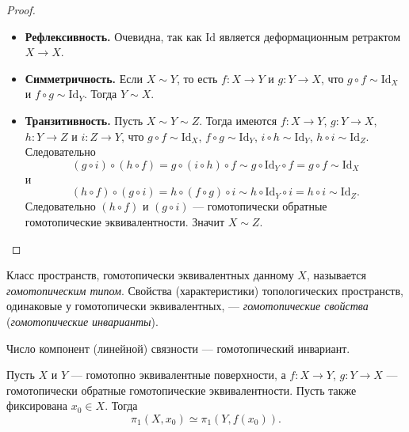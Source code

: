 \documentclass[12pt,a4paper]{article}
\newcommand{\Id}{\ensuremath{\mathrm{Id}}\xspace}
\begin{document}
    \begin{proof}
        \begin{itemize}
            \item \textbf{Рефлексивность.} Очевидна, так как $\Id$ является деформационным ретрактом $X \to X$.
            \item \textbf{Симметричность.} Если $X \sim Y$, то есть $f: X \to Y$ и $g: Y \to X$, что $g \circ f \sim \Id_X$ и $f \circ g \sim \Id_Y$. Тогда $Y \sim X$.
            \item \textbf{Транзитивность.} Пусть $X \sim Y \sim Z$. Тогда имеются $f: X \to Y$, $g: Y \to X$, $h: Y \to Z$ и $i: Z \to Y$, что $g \circ f \sim \Id_X$, $f \circ g \sim \Id_Y$, $i \circ h \sim \Id_Y$, $h \circ i \sim \Id_Z$. Следовательно
                \[
                    (g \circ i) \circ (h \circ f)
                    = g \circ (i \circ h) \circ f
                    \sim g \circ \Id_Y \circ f
                    = g \circ f
                    \sim \Id_X
                \]
                и
                \[
                    (h \circ f) \circ (g \circ i)
                    = h \circ (f \circ g) \circ i
                    \sim h \circ \Id_Y \circ i
                    = h \circ i
                    \sim \Id_Z.
                \]
                Следовательно $(h \circ f)$ и $(g \circ i)$ --- гомотопически обратные гомотопические эквивалентности. Значит $X \sim Z$.
        \end{itemize}
    \end{proof}

    \begin{definition}
        Класс пространств, гомотопически эквивалентных данному $X$, называется \emph{гомотопическим типом}. Свойства (характеристики) топологических пространств, одинаковые у гомотопически эквивалентных, --- \emph{гомотопические свойства} (\emph{гомотопические инварианты}).
    \end{definition}

    \begin{exercise}
        Число компонент (линейной) связности --- гомотопический инвариант.
    \end{exercise}

    \begin{theorem}
        Пусть $X$ и $Y$ --- гомотопно эквивалентные поверхности, а $f: X \to Y$, $g: Y \to X$ --- гомотопически обратные гомотопические эквивалентности. Пусть также фиксирована $x_0 \in X$. Тогда
        \[\pi_1(X, x_0) \simeq \pi_1(Y, f(x_0)).\]
    \end{theorem}
\end{document}
